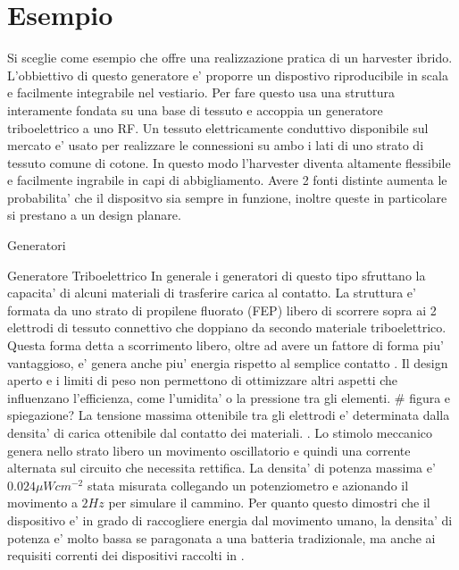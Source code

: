 \chapter{Esempio }
\begin{multicols}{2}
    Si sceglie come esempio \cite{kouWearableAllFabricHybrid2024} che offre una realizzazione pratica di un harvester ibrido. L'obbiettivo di questo generatore e' proporre un dispostivo riproducibile in scala e facilmente integrabile nel vestiario. Per fare questo usa una struttura interamente fondata su una base di tessuto e accoppia un generatore triboelettrico a uno RF. Un tessuto elettricamente conduttivo disponibile sul mercato e' usato per realizzare le connessioni su ambo i lati di uno strato di tessuto comune di cotone. In questo modo l'harvester diventa altamente flessibile e facilmente ingrabile in capi di abbigliamento. Avere 2 fonti distinte aumenta le probabilita' che il dispositvo sia sempre in funzione, inoltre queste in particolare si prestano a un design planare.

\begin{section}{Generatori}
    \begin{subsection}{Generatore Triboelettrico}
        In generale i generatori di questo tipo sfruttano la capacita' di alcuni materiali di trasferire carica al contatto. La struttura e' formata da uno strato di propilene fluorato (FEP) libero di scorrere sopra ai 2 elettrodi di tessuto connettivo che doppiano da secondo materiale triboelettrico. Questa forma detta a scorrimento libero, oltre ad avere un fattore di forma piu' vantaggioso, e' genera anche piu' energia rispetto al semplice contatto \cite{fuAchievingUltraDurabilityHigh2024}. Il design aperto e i limiti di peso non permettono di ottimizzare altri aspetti che influenzano l'efficienza, come l'umidita' o la pressione tra gli elementi.
        \# figura e spiegazione?
        La tensione massima ottenibile tra gli elettrodi e' determinata dalla densita' di carica ottenibile dal contatto dei materiali. . Lo stimolo meccanico genera nello strato libero un movimento oscillatorio e quindi una corrente alternata sul circuito che necessita rettifica. La densita' di potenza massima e' \(0.024\mu Wcm^{-2}\) stata misurata collegando un potenziometro e azionando il movimento a \(2Hz\) per simulare il cammino. Per quanto questo dimostri che il dispositivo e' in grado di raccogliere energia dal movimento umano, la densita' di potenza e' molto bassa se paragonata a una batteria tradizionale, ma anche ai requisiti correnti dei dispositivi raccolti in \cite{AdvancedEnergyHarvesters}.
    \end{subsection}
    

\end{section}
\end{multicols}
